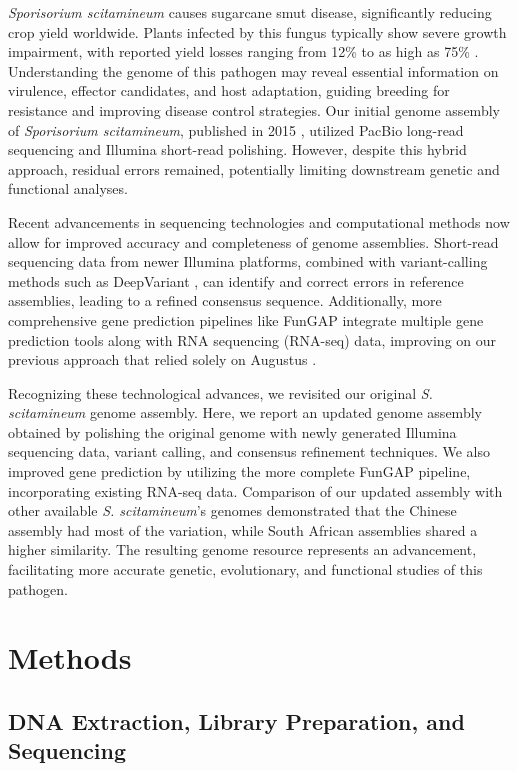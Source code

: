 \documentclass[Journal,letterpaper]{ascelike-new}
\begin{document}
\textit{Sporisorium scitamineum} causes sugarcane smut disease,
significantly reducing crop yield worldwide. Plants infected by this
fungus typically show severe growth impairment, with reported yield
losses ranging from 12\% to as high as 75\% \cite{Rajput2024}.
Understanding the genome of this pathogen may reveal essential
information on virulence, effector candidates, and host adaptation,
guiding breeding for resistance and improving disease control
strategies. Our initial genome assembly of \textit{Sporisorium
scitamineum}, published in 2015 \cite{sscita2015}, utilized PacBio
long-read sequencing and Illumina short-read polishing. However,
despite this hybrid approach, residual errors remained, potentially
limiting downstream genetic and functional analyses.

Recent advancements in sequencing technologies and computational
methods now allow for improved accuracy and completeness of genome
assemblies. Short-read sequencing data from newer Illumina platforms,
combined with variant-calling methods such as DeepVariant
\cite{deepvariant2018}, can identify and correct errors in reference
assemblies, leading to a refined consensus sequence. Additionally,
more comprehensive gene prediction pipelines like FunGAP
\cite{fungap} integrate multiple gene prediction tools along with RNA
sequencing (RNA-seq) data, improving on our previous approach that
relied solely on Augustus \cite{augustus2006}.

Recognizing these technological advances, we revisited our original
\textit{S. scitamineum} genome assembly. Here, we report an updated
genome assembly obtained by polishing the original genome with newly
generated Illumina sequencing data, variant calling, and consensus
refinement techniques. We also improved gene prediction by utilizing
the more complete FunGAP pipeline, incorporating existing RNA-seq
data. Comparison of our updated assembly with other available
\textit{S. scitamineum}'s genomes demonstrated that the Chinese
assembly \cite{refencegenome} had most of the variation, while South
African assemblies shared a higher similarity.
The resulting genome resource represents an advancement, facilitating
more accurate genetic, evolutionary, and functional studies of this pathogen.

\section*{Methods}

\subsection*{DNA Extraction, Library Preparation, and Sequencing}
\end{document}
